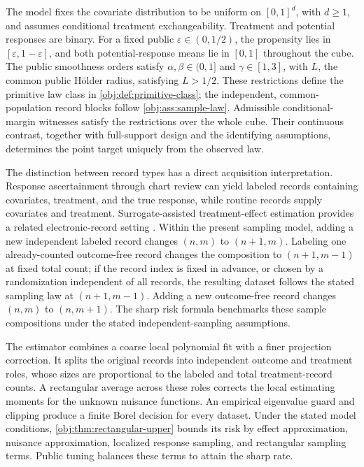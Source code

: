 The model fixes the covariate distribution to be uniform on \([0,1]^d\), with \(d\ge1\), and assumes conditional treatment exchangeability. Treatment and potential responses are binary. For a fixed public \(\varepsilon\in(0,1/2)\), the propensity lies in \([\varepsilon,1-\varepsilon]\), and both potential-response means lie in \([0,1]\) throughout the cube. The public smoothness orders satisfy \(\alpha,\beta\in(0,1]\) and \(\gamma\in[1,3]\), with \(L\), the common public Hölder radius, satisfying \(L>1/2\). These restrictions define the primitive law class in \cref{obj:def:primitive-class}; the independent, common-population record blocks follow \cref{obj:ass:sample-law}. Admissible conditional-margin witnesses satisfy the restrictions over the whole cube. Their continuous contrast, together with full-support design and the identifying assumptions, determines the point target uniquely from the observed law.

The distinction between record types has a direct acquisition interpretation. Response ascertainment through chart review can yield labeled records containing covariates, treatment, and the true response, while routine records supply covariates and treatment. Surrogate-assisted treatment-effect estimation provides a related electronic-record setting \citep[Sections 2.1, 2.5--2.6, and 4]{ChengAnanthakrishnanCai2021}. Within the present sampling model, adding a new independent labeled record changes \((n,m)\) to \((n+1,m)\). Labeling one already-counted outcome-free record changes the composition to \((n+1,m-1)\) at fixed total count; if the record index is fixed in advance, or chosen by a randomization independent of all records, the resulting dataset follows the stated sampling law at \((n+1,m-1)\). Adding a new outcome-free record changes \((n,m)\) to \((n,m+1)\). The sharp risk formula benchmarks these sample compositions under the stated independent-sampling assumptions.

The estimator combines a coarse local polynomial fit with a finer projection correction. It splits the original records into independent outcome and treatment roles, whose sizes are proportional to the labeled and total treatment-record counts. A rectangular average across these roles corrects the local estimating moments for the unknown nuisance functions. An empirical eigenvalue guard and clipping produce a finite Borel decision for every dataset. Under the stated model conditions, \cref{obj:thm:rectangular-upper} bounds its risk by effect approximation, nuisance approximation, localized response sampling, and rectangular sampling terms. Public tuning balances these terms to attain the sharp rate.

